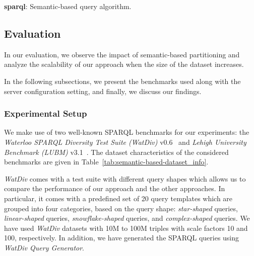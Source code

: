 \begin{algorithm*}
\caption{\textbf{sparql}: Semantic-based query algorithm.}
\label{alg:semantic-based-sparql}
\end{algorithm*}

\subsection{Evaluation}
\label{sec:semantic-based-evaluation}

In our evaluation, we observe the impact of semantic-based partitioning and analyze the scalability of our approach when the size of the dataset increases.

In the following subsections, we present the benchmarks used along with the server configuration setting, and finally, we discuss our findings.

\subsubsection{Experimental Setup}
We make use of two well-known SPARQL benchmarks for our experiments: 
the \textit{Waterloo SPARQL Diversity Test Suite (WatDiv)} v0.6~\cite{Alu2014DiversifiedST} and \textit{Lehigh University Benchmark (LUBM)} v3.1~\cite{Guo2005LUBMAB}.
The dataset characteristics of the considered benchmarks are given in Table~\ref{tab:semantic-based-dataset_info}.

\textit{WatDiv} comes with a test suite with different query shapes which allows us to compare the performance of our approach and the other approaches. 
In particular, it comes with a predefined set of 20 query templates which are grouped into four categories, based on the query shape: \textit{star-shaped} queries, \textit{linear-shaped} queries, \textit{snowflake-shaped} queries, and \textit{complex-shaped} queries.
We have used \textit{WatDiv} datasets with 10M to 100M triples with scale factors 10 and 100, respectively.
In addition, we have generated the SPARQL queries using \textit{WatDiv Query Generator}.

